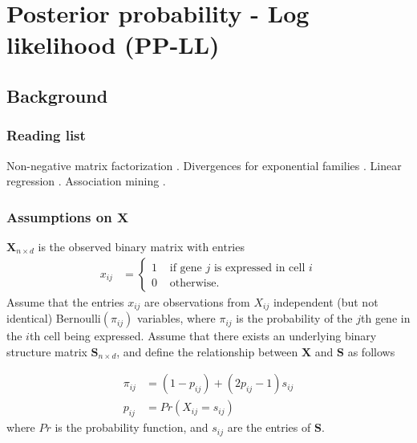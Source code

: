 \documentclass[12pt]{article}
\begin{document}
\newcommand{\comm}[1]{}

\newcommand{\mb}{\mathbf}

\section{Posterior probability - Log likelihood {\small(PP-LL)}} \label{sec:loglik} %

\subsection{Background} 

\subsubsection*{Reading list} %
Non-negative matrix factorization \cite{Lee1999Learning}. 
Divergences for exponential families \cite{Banerjee2005Clustering}.
Linear regression  \cite[ch 12.3]{Casella2002Statistical}.  
Association mining \cite{Agrawal1993Mining}.

\subsubsection*{Assumptions on $\mathbf{X}$} %

$\mathbf{X}_{n \times d}$ is the observed binary matrix with entries
\begin{align}
  x_{ij} &= 
  \begin{cases}
   1 &  \text{ if gene $j$ is expressed in cell $i$} \\
   0 & \text{ otherwise.}
  \end{cases}
\end{align}
Assume that the entries $x_{ij}$ are observations from $X_{ij}$  independent (but not identical) Bernoulli$(\pi_{ij})$ variables, where $\pi_{ij}$ is the probability of the $j$th gene in the $i$th cell being expressed. 
Assume that there exists an underlying binary structure matrix $\mathbf{S}_{n \times d}$, and define the relationship between  $\mathbf{X}$ and  $\mathbf{S}$ as follows

\begin{align} \label{eg: Xassumptions}
   \pi_{ij} &= (1 -  p_{ij}) + (2  p_{ij} - 1) s_{ij} \\
   p_{ij} & =  Pr(X_{ij} = s_{ij}) \nonumber
\end{align}
where $Pr$ is the probability function, and $s_{ij}$ are the entries of $\mathbf{S}$.
\end{document}
